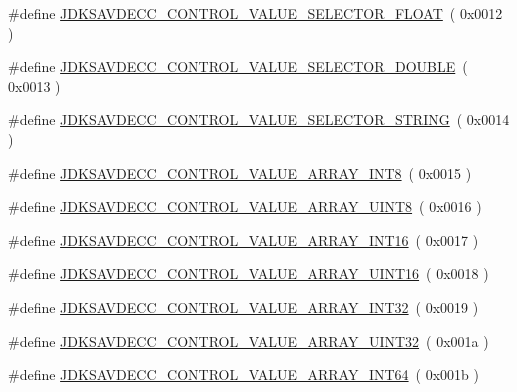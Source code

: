 \begin{DoxyCompactItemize}
\item 
\#define \hyperlink{group__aem__control__value_gac1e5f416db61b9b5bb763b106c341f11}{J\+D\+K\+S\+A\+V\+D\+E\+C\+C\+\_\+\+C\+O\+N\+T\+R\+O\+L\+\_\+\+V\+A\+L\+U\+E\+\_\+\+S\+E\+L\+E\+C\+T\+O\+R\+\_\+\+F\+L\+O\+AT}~( 0x0012 )
\item 
\#define \hyperlink{group__aem__control__value_gab8c3d85c6aa812b9ee464f7c7da89016}{J\+D\+K\+S\+A\+V\+D\+E\+C\+C\+\_\+\+C\+O\+N\+T\+R\+O\+L\+\_\+\+V\+A\+L\+U\+E\+\_\+\+S\+E\+L\+E\+C\+T\+O\+R\+\_\+\+D\+O\+U\+B\+LE}~( 0x0013 )
\item 
\#define \hyperlink{group__aem__control__value_ga7e999561157d6a7520482a970489d666}{J\+D\+K\+S\+A\+V\+D\+E\+C\+C\+\_\+\+C\+O\+N\+T\+R\+O\+L\+\_\+\+V\+A\+L\+U\+E\+\_\+\+S\+E\+L\+E\+C\+T\+O\+R\+\_\+\+S\+T\+R\+I\+NG}~( 0x0014 )
\item 
\#define \hyperlink{group__aem__control__value_gaa4fd4dd4b0d2c11f88ec7f1660cc31f9}{J\+D\+K\+S\+A\+V\+D\+E\+C\+C\+\_\+\+C\+O\+N\+T\+R\+O\+L\+\_\+\+V\+A\+L\+U\+E\+\_\+\+A\+R\+R\+A\+Y\+\_\+\+I\+N\+T8}~( 0x0015 )
\item 
\#define \hyperlink{group__aem__control__value_ga67779f74fe3469ff3527663811440bd6}{J\+D\+K\+S\+A\+V\+D\+E\+C\+C\+\_\+\+C\+O\+N\+T\+R\+O\+L\+\_\+\+V\+A\+L\+U\+E\+\_\+\+A\+R\+R\+A\+Y\+\_\+\+U\+I\+N\+T8}~( 0x0016 )
\item 
\#define \hyperlink{group__aem__control__value_ga792b4688d01555b348c9bcf220b9cd0a}{J\+D\+K\+S\+A\+V\+D\+E\+C\+C\+\_\+\+C\+O\+N\+T\+R\+O\+L\+\_\+\+V\+A\+L\+U\+E\+\_\+\+A\+R\+R\+A\+Y\+\_\+\+I\+N\+T16}~( 0x0017 )
\item 
\#define \hyperlink{group__aem__control__value_ga85b1ce071d1a6f1f11611a45d2a896c0}{J\+D\+K\+S\+A\+V\+D\+E\+C\+C\+\_\+\+C\+O\+N\+T\+R\+O\+L\+\_\+\+V\+A\+L\+U\+E\+\_\+\+A\+R\+R\+A\+Y\+\_\+\+U\+I\+N\+T16}~( 0x0018 )
\item 
\#define \hyperlink{group__aem__control__value_gaaced30ab1c5d07ff0fc0f14bfe79f1a3}{J\+D\+K\+S\+A\+V\+D\+E\+C\+C\+\_\+\+C\+O\+N\+T\+R\+O\+L\+\_\+\+V\+A\+L\+U\+E\+\_\+\+A\+R\+R\+A\+Y\+\_\+\+I\+N\+T32}~( 0x0019 )
\item 
\#define \hyperlink{group__aem__control__value_gaac7297ab95516302c4ab07808bbc7b08}{J\+D\+K\+S\+A\+V\+D\+E\+C\+C\+\_\+\+C\+O\+N\+T\+R\+O\+L\+\_\+\+V\+A\+L\+U\+E\+\_\+\+A\+R\+R\+A\+Y\+\_\+\+U\+I\+N\+T32}~( 0x001a )
\item 
\#define \hyperlink{group__aem__control__value_ga683d2387af932ad10d80f6b36607f55a}{J\+D\+K\+S\+A\+V\+D\+E\+C\+C\+\_\+\+C\+O\+N\+T\+R\+O\+L\+\_\+\+V\+A\+L\+U\+E\+\_\+\+A\+R\+R\+A\+Y\+\_\+\+I\+N\+T64}~( 0x001b )

\end{DoxyCompactItemize}
